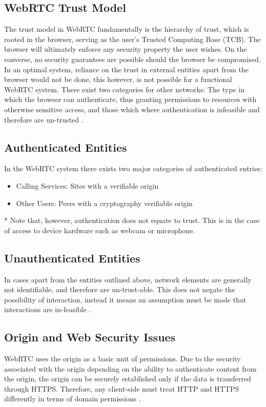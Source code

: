 \subsection{WebRTC Trust Model}
The trust model in WebRTC fundamentally is the hierarchy of trust, which is rooted in the browser, serving as the user’s Trusted Computing Base (TCB). The browser will ultimately enforce any security property the user wishes. On the converse, no security guarantees are possible should the browser be compromised. In an optimal system, reliance on the trust in external entities apart from the browser would not be done, this however, is not possible for a functional WebRTC system. There exist two categories for other networks: The type in which the browser can authenticate, thus granting permissions to resources with otherwise sensitive access, and those which where authentication is infeasible and therefore are un-trusted  \cite{rescorla2013webrtc}.

\subsection{Authenticated Entities}
In the WebRTC system there exists two major categories of authenticated entries:
\begin{itemize}
	\item Calling Services: Sites with a verifiable origin
	\item Other Users: Peers with a cryptography verifiable origin
\end{itemize}
* Note that, however, authentication does not equate to trust. This is in the case of access to device hardware such as webcam or microphone. \cite{rescorla2013webrtc}

\subsection{Unauthenticated Entities}
In cases apart from the entities outlined above, network elements are generally not identifiable, and therefore are un-trust-able. This does not negate the possibility of interaction, instead it means an assumption must be made that interactions are in-feasible \cite{rescorla2013webrtc}.

\subsection{Origin and Web Security Issues}
WebRTC uses the origin as a basic unit of permissions. Due to the security associated with the origin  depending on the ability to authenticate content from the origin, the origin can be securely established only if the data is transferred through HTTPS. Therefore, any client-side must treat HTTP and HTTPS differently in terms of domain permissions \cite{rescorla2013webrtc}.

